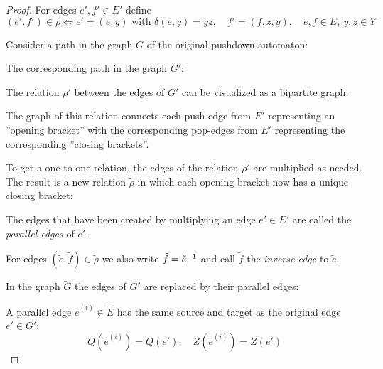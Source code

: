 \begin{proof}
For edges $e', f' \in E'$ define
\[ (e', f') \in \rho \iff e' = (e, y)\text{ with }\delta(e, y) = y z,\quad
f' = (f, z, y),\quad e, f \in E,\ y,z \in Y \]

Consider a path in the graph $G$ of the original pushdown automaton:

\begin{center}

\end{center}

The corresponding path in the graph $G'$:

\begin{center}

\end{center}

The relation $\rho'$ between the edges of $G'$ can be visualized as a bipartite
graph:

\begin{center}

\end{center}

The graph of this relation connects each push-edge from $E'$ representing an 
''opening bracket'' with the corresponding pop-edges from $E'$ representing the
corresponding ''closing brackets''.

To get a one-to-one relation, the edges of the relation $\rho'$ are multiplied
as needed. The result is a new relation $\tilde{\rho}$ in which each
opening bracket now has a unique closing bracket:

\begin{center}

\end{center}

The edges that have been created by multiplying an edge $e' \in E'$ are called
the {\em parallel edges} of $e'$.

For edges $(\tilde{e}, \tilde f) \in \tilde{\rho}$ we also write $\tilde f =
\mbox{${\tilde e}^{-1}$}$ and call $\tilde f$ the {\em inverse edge} to $\tilde e$.

In the graph $\tilde{G}$ the edges of $G'$ are replaced by their parallel edges:

\begin{center}

\end{center}

A parallel edge $\tilde{e}^{(i)} \in \tilde E$ has the same source and target as
the original edge $e' \in G'$:
\[ Q(\tilde{e}^{(i)}) = Q(e'),\quad Z(\tilde{e}^{(i)}) = Z(e') \]


\end{proof}
